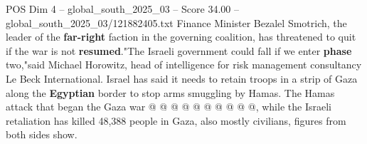 \begin{textsample}{POS Dim 4 – global\_south\_2025\_03 – Score 34.00 – global\_south\_2025\_03/121882405.txt}
Finance Minister Bezalel Smotrich, the leader of the \textbf{far-right} faction in the governing coalition, has threatened to quit if the war is not \textbf{resumed}."The Israeli government could fall if we enter \textbf{phase} two,"said Michael Horowitz, head of intelligence for risk management consultancy Le Beck International.
Israel has said it needs to retain troops in a strip of Gaza along the \textbf{Egyptian} border to stop arms smuggling by Hamas.
The Hamas attack that began the Gaza war @ @ @ @ @ @ @ @ @ @, while the Israeli retaliation has killed 48,388 people in Gaza, also mostly civilians, figures from both sides show.

\end{textsample}
